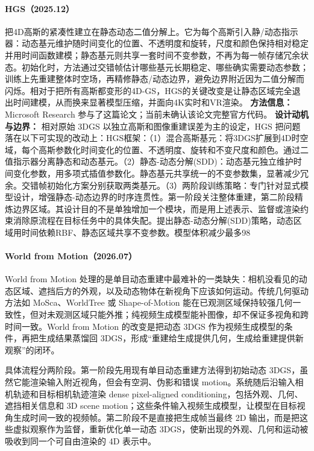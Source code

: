 \paragraph{HGS（2025.12）\cite{2512_14352}}
把4D高斯的紧凑性建立在静态动态二值分解上。它为每个高斯引入静/动态指示器：动态基元维护随时间变化的位置、不透明度和旋转，尺度和颜色保持相对稳定并用时间函数建模；静态基元则共享一套时间不变参数，不再为每一帧存储冗余状态。初始化时，方法通过交错帧估计哪些基元长期稳定、哪些确实需要动态参数；训练上先重建整体时空场，再精修静态/动态边界，避免边界附近因为二值分解而闪烁。相对于把所有高斯都变形的4D-GS，HGS的关键改变是让静态区域完全退出时间建模，从而换来显著模型压缩，并面向4K实时和VR渲染。
\textbf{方法信息：} Microsoft Research 参与了这篇论文；当前未确认该论文完整官方代码。
\textbf{设计动机与边界：} 相对原始 3DGS 以独立高斯和图像重建误差为主的设定，HGS 把问题落在以下可实现的改动上：HGS框架：（1）混合高斯基元：将3DGS扩展到4D时空域，每个高斯参数化时间变化的位置、不透明度、旋转和不变尺度和颜色。通过二值指示器分离静态和动态基元。（2）静态-动态分解(SDD)：动态基元独立维护时间变化参数，用多项式插值参数化。静态基元共享统一的不变参数集，显著减少冗余。交错帧初始化方案分别获取两类基元。（3）两阶段训练策略：专门针对显式模型设计，增强静态-动态边界的时序连贯性。第一阶段关注整体重建，第二阶段精炼边界区域。其设计目的不是单独增加一个模块，而是用上述表示、监督或渲染约束消除原流程在目标任务中的具体失配。提出静态-动态分解(SDD)策略，动态区域用时间依赖RBF、静态区域共享不变参数。模型体积减少最多98%
\paragraph{World from Motion（2026.07）\cite{2607_01202}}
World from Motion 处理的是单目动态重建中最难补的一类缺失：相机没看见的动态区域、遮挡后方的外观，以及动态物体在新视角下应该如何运动。传统几何驱动方法如 MoSca、WorldTree 或 Shape-of-Motion 能在已观测区域保持较强几何一致性，但对未观测区域只能外推；纯视频生成模型能补图像，却不保证多视角和跨时间一致。World from Motion 的改变是把动态 3DGS 作为视频生成模型的条件，再把生成结果蒸馏回 3DGS，形成“重建给生成提供几何，生成给重建提供新观察”的闭环。

具体流程分两阶段。第一阶段先用现有单目动态重建方法得到初始动态 3DGS，虽然它能渲染输入附近视角，但会有空洞、伪影和错误 motion。系统随后沿输入相机轨迹和目标相机轨迹渲染 dense pixel-aligned conditioning，包括外观、几何、遮挡相关信息和 3D scene motion；这些条件输入视频生成模型，让模型在目标视角生成时间一致的视频帧。第二阶段不是直接把生成帧当最终 2D 输出，而是把这些虚拟观察作为监督，重新优化单一动态 3DGS，使新出现的外观、几何和运动被吸收到同一个可自由渲染的 4D 表示中。

